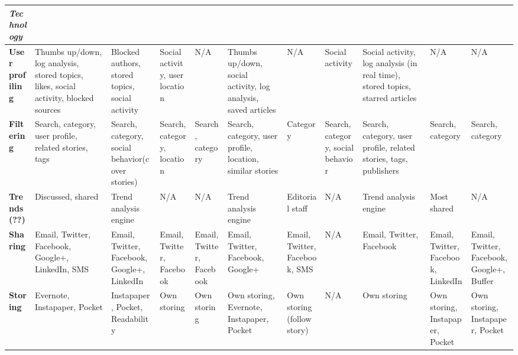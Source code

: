 \begin{landscape}
\begin{center}
\begin{longtable}{ | p{2cm} | p{1.8cm} | p{1.8cm} | p{1.7cm} | p{1.7cm} | p{1.8cm} | p{1.7cm} | p{1.7cm} | p{1.8cm} | p{1.7cm} | p{1.7cm} |}
\textit{\textbf{Technology}} & & & & & & & & & & \\ \hline

\textbf{User profiling} & Thumbs up/down, log analysis, stored topics, likes, social activity, blocked sources & Blocked authors, stored topics, social activity & Social activity, user location & N/A & Thumbs up/down, social activity, log analysis, saved articles & N/A & Social activity & Social activity, log analysis (in real time), stored topics, starred articles & N/A & N/A \\ \hline

\textbf{Filtering} & Search, category, user profile, related stories, tags & Search, category, social behavior(cover stories) & Search, category, location & Search, category & Search, category, user profile, location, similar stories & Category & Search, category, social behavior & Search, category, user profile, related stories, tags, publishers & Search, category & Search, category \\ \hline

\textbf{Trends (??)} & Discussed, shared & Trend analysis engine & N/A & N/A & Trend analysis engine & Editorial staff & N/A & Trend analysis engine & Most shared & N/A \\ \hline

\textbf{Sharing} & Email, Twitter, Facebook, Google+, LinkedIn, SMS & Email, Twitter, Facebook, Google+, LinkedIn & Email, Twitter, Facebook & Email, Twitter, Facebook & Email, Twitter, Facebook, Google+ & Email, Twitter, Facebook, SMS & N/A & Email, Twitter, Facebook & Email, Twitter, Facebook, LinkedIn & Email, Twitter, Facebook, Google+, Buffer \\ \hline

\textbf{Storing} & Evernote, Instapaper, Pocket & Instapaper, Pocket, Readability & Own storing & Own storing & Own storing, Evernote, Instapaper, Pocket & Own storing (follow story) & N/A & Own storing & Own storing, Instapaper, Pocket & Own storing, Instapaper, Pocket \\ \hline

\end{longtable}
\end{center}
\end{landscape}



